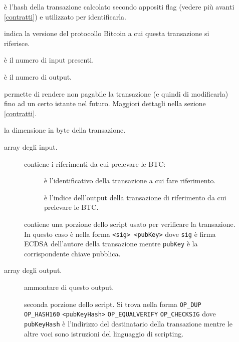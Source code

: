 \begin{description}
    \item[] è l'hash della transazione calcolato secondo appositi flag (vedere più avanti \ref{contratti}) e utilizzato per identificarla.
    \item[] indica la versione del protocollo Bitcoin a cui questa transazione si riferisce.
    \item[] è il numero di input presenti.
    \item[] è il numero di output.
    \item[] permette di rendere non pagabile la transazione (e quindi di modificarla) fino ad un certo istante nel futuro. Maggiori dettagli nella sezione \ref{contratti}.
    \item[] la dimensione in byte della transazione.
    \item[] array degli input.\begin{description}
      \item[] contiene i riferimenti da cui prelevare le BTC:\begin{description}
            \item[] è l'identificativo della transazione a cui fare riferimento.
            \item[] è l'indice dell'output della transazione di riferimento da cui prelevare le BTC.
        \end{description}
      \item[] contiene una porzione dello script usato per verificare la transazione. In questo caso è nella forma \verb|<sig> <pubKey>| dove \verb|sig| è firma ECDSA dell'autore della transazione mentre \verb|pubKey| è la corrispondente chiave pubblica.
      \end{description}
    \item[] array degli output.\begin{description}
      \item[] ammontare di questo output.
      \item[] seconda porzione dello script. Si trova nella forma \verb|OP_DUP| \verb|OP_HASH160| \verb|<pubKeyHash>| \verb|OP_EQUALVERIFY| \verb|OP_CHECKSIG| dove \verb|pubKeyHash| è l'indirizzo del destinatario della transazione mentre le altre voci sono istruzioni del linguaggio di scripting.
    \end{description}
\end{description}

